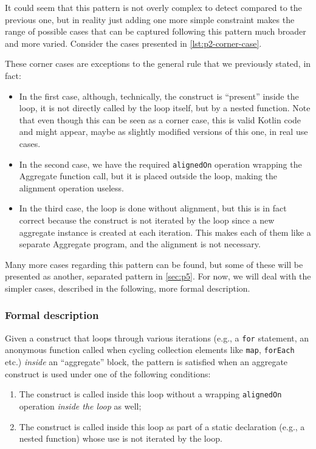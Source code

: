 \documentclass[12pt,a4paper,openright,twoside]{book}
\begin{document}
It could seem that this pattern is not overly complex to detect compared to the
previous one, but in reality just adding one more simple constraint makes the
range of possible cases that can be captured following this pattern much broader
and more varied. Consider the cases presented in \cref{lst:p2-corner-case}. 

These corner cases are exceptions to the general rule that we previously stated,
in fact:
\begin{itemize}
  \item In the first case, although, technically, the construct is ``present''
  inside the loop, it is not directly called by the loop itself, but by a nested
  function. Note that even though this can be seen as a corner case, this is
  valid Kotlin code and might appear, maybe as slightly modified versions of
  this one, in real use cases.
  \item In the second case, we have the required \lstinline{alignedOn} operation
  wrapping the Aggregate function call, but it is placed outside the loop,
  making the alignment operation useless.
  \item In the third case, the loop is done without alignment, but this is in
  fact correct because the construct is not iterated by the loop since a new
  aggregate instance is created at each iteration. This makes each of them
  like a separate Aggregate program, and the alignment is not necessary.
\end{itemize}

Many more cases regarding this pattern can be found, but some of these will be
presented as another, separated pattern in \cref{sec:p5}. For now, we will deal
with the simpler cases, described in the following, more formal description.

\subsubsection{Formal description}

Given a construct that loops through various iterations (e.g., a \lstinline{for}
statement, an anonymous function called when cycling collection elements like
\lstinline{map}, \lstinline{forEach} etc.) \emph{inside} an ``aggregate'' block,
the pattern is satisfied when an aggregate construct is used under one of the
following conditions:
\begin{enumerate}
  \item The construct is called inside this loop without a wrapping
  \lstinline{alignedOn} operation \emph{inside the loop} as well;
  \item The construct is called inside this loop as part of a static declaration
  (e.g., a nested function) whose use is not iterated by the loop.
\end{enumerate}
\end{document}
